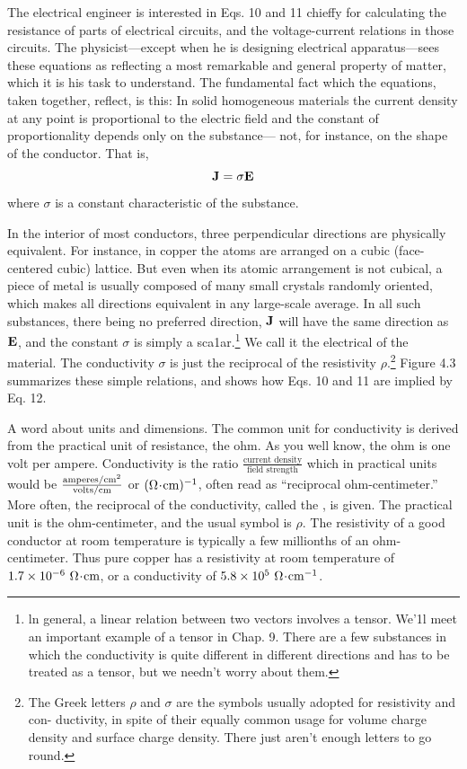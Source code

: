 The electrical engineer is interested in Eqs. 10 and 11 chieffy for
calculating the resistance of parts of electrical circuits, and the
voltage-current relations in those circuits. The physicist---except
when he is designing electrical apparatus---sees these equations as
reflecting a most remarkable and general property of matter, which
it is his task to understand. The fundamental fact which the 
equations, taken together, reflect, is this: In solid homogeneous materials
the current density at any point is proportional to the electric field
and the constant of proportionality depends only on the substance---
not, for instance, on the shape of the conductor. That is,
\begin{equation}
  \mathbf{J}=\sigma\mathbf{E}
\end{equation}
where $\sigma$ is a constant characteristic of the substance.

In the interior of most conductors, three perpendicular directions
are physically equivalent. For instance, in copper the atoms are
arranged on a cubic (face-centered cubic) lattice. But even when
its atomic arrangement is not cubical, a piece of metal is usually
composed of many small crystals randomly oriented, which makes
all directions equivalent in any large-scale average. In all such 
substances, there being no preferred direction, $\mathbf{J}$ will have the same
direction as $\mathbf{E}$, and the constant $\sigma$ is simply a 
sca1ar.\footnote{ln general, a linear relation between two vectors involves a tensor. We'1l meet an
important example of a tensor in Chap. 9. There are a few substances in which the
conductivity is quite different in different directions and has to be treated as a tensor,
but we needn't worry about them.} 
We call it the
electrical  of the material. The conductivity $\sigma$ is just the
reciprocal of the resistivity 
$\rho$.\footnote{The Greek letters $\rho$ and $\sigma$ are the symbols usually adopted for resistivity and con-
ductivity, in spite of their equally common usage for volume charge density and surface
charge density. There just aren't enough letters to go round.} Figure 4.3 summarizes these simple
relations, and shows how Eqs. 10 and 11 are implied by Eq. 12.


A word about units and dimensions. The common unit for conductivity
is derived from the practical unit of resistance, the ohm. As
you well know, the ohm is one volt per ampere. Conductivity is the
ratio $\frac{\text{current density}}{\text{field strength}}$
which in practical units would be
$\frac{\textup{amperes}/\textup{cm}^2}{\textup{volts}/\textup{cm}}$
or $(\Omega\!\cdot\!\textup{cm})^{-1}$, often read as ``reciprocal ohm-centimeter.'' More
often, the reciprocal of the conductivity, called the , is given.
The practical unit is the ohm-centimeter, and the usual symbol is $\rho$.
The resistivity of a good conductor at room temperature is typically
a few millionths of an ohm-centimeter. Thus pure copper has a
resistivity at room temperature of $1.7 \times 10^{-6}\ \ohmunit\unitdot\cmunit$, or a conductivity
of $5.8\times 10^5\ \ohmunit\unitdot\cmunit^{-1}$.

